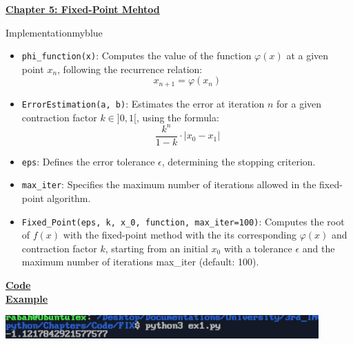 \newpage
\begin{center}
    \Huge{\textbf{\underline{Chapter 5: Fixed-Point Mehtod}}}
\end{center}

\vspace{0.77cm}
\setcounter{section}{0}

\begin{prettyBox}{Implementation}{myblue}
\begin{itemize}
\item \texttt{phi\_function(x)}: Computes the value of the function \( \varphi(x) \) at a
given point \( x_n \), following the recurrence relation:  
          \[
          x_{n+1} = \varphi(x_n)
          \]
\item \texttt{ErrorEstimation(a, b)}: Estimates the error at iteration \(n\) for a given 
contraction factor \( k \in ]0,1[\), using the formula:  
          \[
          \dfrac{k^n}{1-k} \cdot |x_0 - x_1|
          \]

    \item \texttt{eps}: Defines the error tolerance \( \epsilon \), determining the stopping
    criterion.

    \item \texttt{max\_iter}: Specifies the maximum number of iterations allowed in the 
fixed-point algorithm.

\item \texttt{Fixed\_Point(eps, k, x\_0, function, max\_iter=100)}: Computes the root of \( f(x) \) with the fixed-point method with the  
its corresponding \( \varphi(x) \) and contraction factor \( k \), starting from an
initial \( x_0 \) with a tolerance \( \epsilon \) and the maximum number of iterations max\_iter (default: 100).
\end{itemize}
\end{prettyBox}
\vspace{1cm}
\textbf{\underline{Code}}\\[0.1cm]


\newpage
\textbf{\underline{Example}}\\[0.1cm]


\vspace{0.5cm}

\begin{center}
    \includegraphics[width = 0.9\textwidth]{Chapters/ScreenShot/FIX/fix.png}
\end{center}

